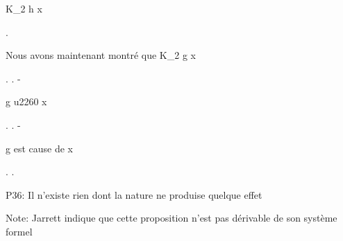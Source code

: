 \documentclass[10pt]{report}
\begin{document}
\begin{coqdoccode}
\begin{coqdoccomment}
K\_2\coqdocindent{0.50em}
h\coqdocindent{0.50em}
x\coqdocindent{0.50em}
\end{coqdoccomment}
\coqdoceol
\coqdocindent{1.00em}
   .\coqdoceol
\coqdocemptyline
\coqdocindent{1.00em}
\begin{coqdoccomment}
\coqdocindent{0.50em}
Nous\coqdocindent{0.50em}
avons\coqdocindent{0.50em}
maintenant\coqdocindent{0.50em}
montré\coqdocindent{0.50em}
que\coqdocindent{0.50em}
K\_2\coqdocindent{0.50em}
g\coqdocindent{0.50em}
x\coqdocindent{0.50em}
\end{coqdoccomment}
\coqdoceol
\coqdocindent{1.00em}
\coqdoctac{\ensuremath{\exists}} .\coqdoceol
\coqdocindent{1.00em}
.\coqdoceol
\coqdocindent{1.00em}
- \begin{coqdoccomment}
\coqdocindent{0.50em}
g\coqdocindent{0.50em}
u2260\coqdocindent{0.50em}
x\coqdocindent{0.50em}
\end{coqdoccomment}
\coqdoceol
\coqdocindent{2.00em}
 .  .\coqdoceol
\coqdocindent{1.00em}
- \begin{coqdoccomment}
\coqdocindent{0.50em}
g\coqdocindent{0.50em}
est\coqdocindent{0.50em}
cause\coqdocindent{0.50em}
de\coqdocindent{0.50em}
x\coqdocindent{0.50em}
\end{coqdoccomment}
\coqdoceol
\coqdocindent{2.00em}
 .\coqdoceol
\coqdocnoindent
{}.\coqdoceol
\coqdocemptyline
\coqdocnoindent
\begin{coqdoccomment}
\coqdocindent{0.50em}
P36:\coqdocindent{0.50em}
Il\coqdocindent{0.50em}
n'existe\coqdocindent{0.50em}
rien\coqdocindent{0.50em}
dont\coqdocindent{0.50em}
la\coqdocindent{0.50em}
nature\coqdocindent{0.50em}
ne\coqdocindent{0.50em}
produise\coqdocindent{0.50em}
quelque\coqdocindent{0.50em}
effet\coqdocindent{0.50em}
\end{coqdoccomment}
\coqdoceol
\coqdocnoindent
\begin{coqdoccomment}
\coqdocindent{0.50em}
Note:\coqdocindent{0.50em}
Jarrett\coqdocindent{0.50em}
indique\coqdocindent{0.50em}
que\coqdocindent{0.50em}
cette\coqdocindent{0.50em}
proposition\coqdocindent{0.50em}
n'est\coqdocindent{0.50em}
pas\coqdocindent{0.50em}
dérivable\coqdocindent{0.50em}
de\coqdocindent{0.50em}
son\coqdocindent{0.50em}
système\coqdocindent{0.50em}
formel\coqdocindent{0.50em}
\end{coqdoccomment}
\coqdoceol

\end{coqdoccode}
\end{document}
